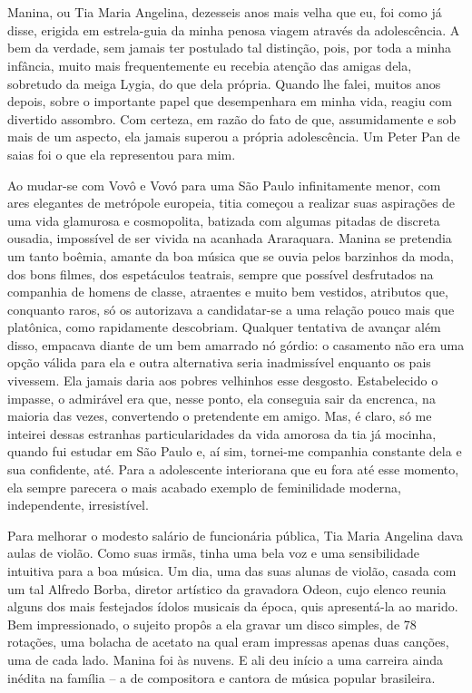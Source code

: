 \chapter{}
Manina, ou Tia Maria Angelina, dezesseis anos mais velha que eu, foi como já disse, erigida em estrela-guia da minha penosa viagem através da adolescência.
A bem da verdade, sem jamais ter postulado tal distinção, pois, por toda a minha infância, muito mais frequentemente eu recebia atenção das amigas dela, sobretudo da meiga Lygia, do que dela própria.
Quando lhe falei, muitos anos depois, sobre o importante papel que desempenhara em minha vida, reagiu com divertido assombro.
Com certeza, em razão do fato de que, assumidamente e sob mais de um aspecto, ela jamais superou a própria adolescência.
Um Peter Pan de saias foi o que ela representou para mim.

Ao mudar-se com Vovô e Vovó para uma São Paulo infinitamente menor, com ares elegantes de metrópole europeia, titia começou a realizar suas aspirações de uma vida glamurosa e cosmopolita, batizada com algumas pitadas de discreta ousadia, impossível de ser vivida na acanhada Araraquara.
Manina se pretendia um tanto boêmia, amante da boa música que se ouvia pelos barzinhos da moda, dos bons filmes, dos espetáculos teatrais, sempre que possível desfrutados na companhia de homens de classe, atraentes e muito bem vestidos, atributos que, conquanto raros, só os autorizava a candidatar-se a uma relação pouco mais que platônica, como rapidamente descobriam.
Qualquer tentativa de avançar além disso, empacava diante de um bem amarrado nó górdio: o casamento não era uma opção válida para ela e outra alternativa seria inadmissível enquanto os pais vivessem.
Ela jamais daria aos pobres velhinhos esse desgosto.
Estabelecido o impasse, o admirável era que, nesse ponto, ela conseguia sair da encrenca, na maioria das vezes, convertendo o pretendente em amigo.
Mas, é claro, só me inteirei dessas estranhas particularidades da vida amorosa da tia já mocinha, quando fui estudar em São Paulo e, aí sim, tornei-me companhia constante dela e sua confidente, até.
Para a adolescente interiorana que eu fora até esse momento, ela sempre parecera o mais acabado exemplo de feminilidade moderna, independente, irresistível.


Para melhorar o modesto salário de funcionária pública, Tia Maria Angelina dava aulas de violão.
Como suas irmãs, tinha uma bela voz e uma sensibilidade intuitiva para a boa música.
Um dia, uma das suas alunas de violão, casada com um tal Alfredo Borba, diretor artístico da gravadora Odeon, cujo elenco reunia alguns dos mais festejados ídolos musicais da época, quis apresentá-la ao marido.
Bem impressionado, o sujeito propôs a ela gravar um disco simples, de 78 rotações, uma bolacha de acetato na qual eram impressas apenas duas canções, uma de cada lado.
Manina foi às nuvens.
E ali deu início a uma carreira ainda inédita na família -- a de compositora e cantora de música popular brasileira.

